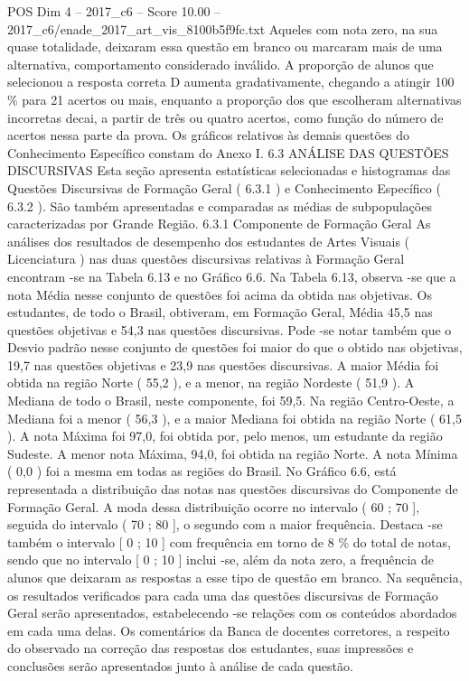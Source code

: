 \begin{textsample}{POS Dim 4 – 2017\_c6 – Score 10.00 – 2017\_c6/enade\_2017\_art\_vis\_8100b5f9fc.txt}
Aqueles com nota zero, na sua quase totalidade, deixaram essa questão em branco ou marcaram mais de uma alternativa, comportamento considerado inválido.
A proporção de alunos que selecionou a resposta correta D aumenta gradativamente, chegando a atingir 100 \% para 21 acertos ou mais, enquanto a proporção dos que escolheram alternativas incorretas decai, a partir de três ou quatro acertos, como função do número de acertos nessa parte da prova.
Os gráficos relativos às demais questões do Conhecimento Específico constam do Anexo I. 6.3 ANÁLISE DAS QUESTÕES DISCURSIVAS Esta seção apresenta estatísticas selecionadas e histogramas das Questões Discursivas de Formação Geral ( 6.3.1 ) e Conhecimento Específico ( 6.3.2 ).
São também apresentadas e comparadas as médias de subpopulações caracterizadas por Grande Região. 6.3.1 Componente de Formação Geral As análises dos resultados de desempenho dos estudantes de Artes Visuais ( Licenciatura ) nas duas questões discursivas relativas à Formação Geral encontram -se na Tabela 6.13 e no Gráfico 6.6.
Na Tabela 6.13, observa -se que a nota Média nesse conjunto de questões foi acima da obtida nas objetivas.
Os estudantes, de todo o Brasil, obtiveram, em Formação Geral, Média 45,5 nas questões objetivas e 54,3 nas questões discursivas.
Pode -se notar também que o Desvio padrão nesse conjunto de questões foi maior do que o obtido nas objetivas, 19,7 nas questões objetivas e 23,9 nas questões discursivas.
A maior Média foi obtida na região Norte ( 55,2 ), e a menor, na região Nordeste ( 51,9 ).
A Mediana de todo o Brasil, neste componente, foi 59,5.
Na região Centro-Oeste, a Mediana foi a menor ( 56,3 ), e a maior Mediana foi obtida na região Norte ( 61,5 ).
A nota Máxima foi 97,0, foi obtida por, pelo menos, um estudante da região Sudeste.
A menor nota Máxima, 94,0, foi obtida na região Norte.
A nota Mínima ( 0,0 ) foi a mesma em todas as regiões do Brasil.
No Gráfico 6.6, está representada a distribuição das notas nas questões discursivas do Componente de Formação Geral.
A moda dessa distribuição ocorre no intervalo ( 60 ; 70 ], seguida do intervalo ( 70 ; 80 ], o segundo com a maior frequência.
Destaca -se também o intervalo [ 0 ; 10 ] com frequência em torno de 8 \% do total de notas, sendo que no intervalo [ 0 ; 10 ] inclui -se, além da nota zero, a frequência de alunos que deixaram as respostas a esse tipo de questão em branco.
Na sequência, os resultados verificados para cada uma das questões discursivas de Formação Geral serão apresentados, estabelecendo -se relações com os conteúdos abordados em cada uma delas.
Os comentários da Banca de docentes corretores, a respeito do observado na correção das respostas dos estudantes, suas impressões e conclusões serão apresentados junto à análise de cada questão.

\end{textsample}
